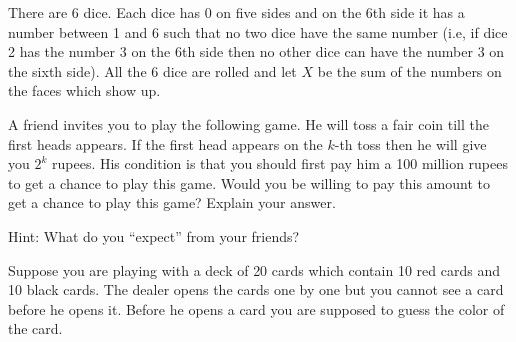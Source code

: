 \documentclass[solution,addpoints,12pt]{exam}
\begin{document}
\begin{questions}
\question There are 6 dice. Each dice has 0 on five sides and on the 6th side it has a number between 1 and 6 such that no two dice have the same number (i.e, if dice 2 has the number 3 on the 6th side then no other dice can have the number 3 on the sixth side). All the 6 dice are rolled and let $X$ be the sum of the numbers on the faces which show up. 


\question[1] A friend invites you to play the following game. He will toss a fair coin till the first heads appears. If the  first head appears on the $k$-th toss then he will give you $2^k$ rupees. His condition is that you should first pay him a 100 million rupees to get a chance to play this game. Would you be willing to pay this amount to get a chance to play this game? Explain your answer.
\begin{solution}
Hint: What do you ``expect'' from your friends?
\end{solution}

\question Suppose you are playing with a deck of 20 cards which contain 10 red cards and 10 black cards. The dealer opens the cards one by one but you cannot see a card before he opens it. Before he opens a card you are supposed to guess the color of the card. 

\begin{parts}

\end{parts}
\end{questions}
\end{document}
